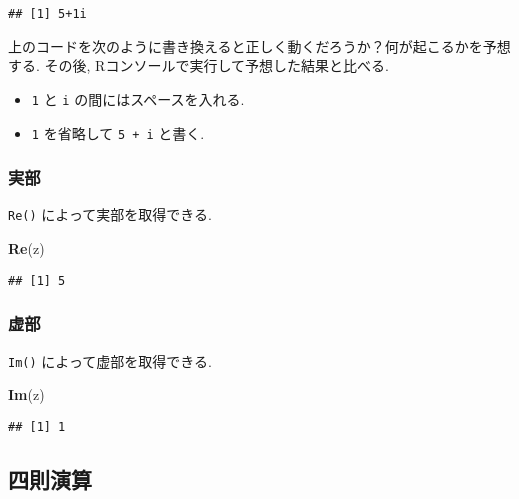 \documentclass[a4paper]{scrbook}
\newenvironment{Shaded}{\begin{snugshade}}{\end{snugshade}}
\newcommand{\KeywordTok}[1]{\textcolor[rgb]{0.13,0.29,0.53}{\textbf{{#1}}}}
\newcommand{\NormalTok}[1]{{#1}}
\providecommand{\tightlist}{%
  \setlength{\itemsep}{0pt}\setlength{\parskip}{0pt}}
\theoremstyle{definition}
\let\BeginKnitrBlock\begin \let\EndKnitrBlock\end
\begin{document}
\begin{verbatim}
## [1] 5+1i
\end{verbatim}

\BeginKnitrBlock{exercise}
上のコードを次のように書き換えると正しく動くだろうか？何が起こるかを予想する.
その後, Rコンソールで実行して予想した結果と比べる.

\begin{itemize}
\tightlist
\item
  \texttt{1} と \texttt{i} の間にはスペースを入れる.
\item
  \texttt{1} を省略して \texttt{5\ +\ i} と書く.
\end{itemize}
\EndKnitrBlock{exercise}

\subsubsection*{実部}

\texttt{Re()} によって実部を取得できる.

\begin{Shaded}
\begin{Highlighting}[]
\KeywordTok{Re}\NormalTok{(z)}
\end{Highlighting}
\end{Shaded}

\begin{verbatim}
## [1] 5
\end{verbatim}

\subsubsection*{虚部}

\texttt{Im()} によって虚部を取得できる.

\begin{Shaded}
\begin{Highlighting}[]
\KeywordTok{Im}\NormalTok{(z)}
\end{Highlighting}
\end{Shaded}

\begin{verbatim}
## [1] 1
\end{verbatim}

\subsection*{四則演算}
\end{document}

